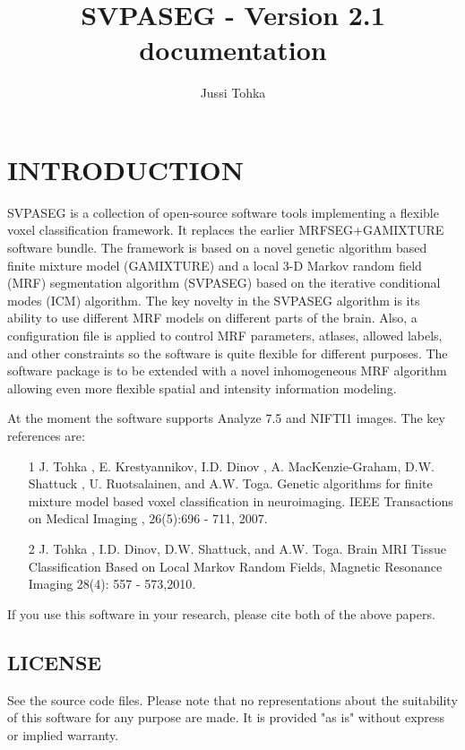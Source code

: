 \documentclass[12pt]{article}
\title{SVPASEG - Version 2.1 documentation}
\author{Jussi Tohka}
\begin{document}
\maketitle 
\tableofcontents

\section{INTRODUCTION}

SVPASEG is a collection of open-source software tools
implementing a flexible voxel classification framework. It replaces the earlier MRFSEG+GAMIXTURE software bundle. The framework is based on a
novel genetic algorithm based finite mixture model (GAMIXTURE) and a local 3-D
Markov random field (MRF) segmentation algorithm (SVPASEG) based on the iterative conditional modes
(ICM) algorithm.  The key novelty in the SVPASEG algorithm is its ability to use different MRF models on different parts of the brain. Also, a configuration file is applied to control MRF parameters, atlases, allowed labels, and other constraints so the software is quite flexible for different purposes.  
The software package is to be extended with a novel
inhomogeneous MRF algorithm allowing even more flexible spatial and
intensity information modeling.  

At the moment the software supports Analyze 7.5 and NIFTI1 images.
The key references are:

\begin{enumerate}
\item[1]  J. Tohka , E. Krestyannikov, I.D. Dinov , A. MacKenzie-Graham,
 D.W. Shattuck , U. Ruotsalainen, and A.W. Toga. 
 Genetic algorithms for finite mixture model based voxel classification
 in neuroimaging.  
 IEEE Transactions on Medical Imaging  , 26(5):696 - 711, 2007. 

\item[2] J. Tohka , I.D. Dinov, D.W. Shattuck, and A.W. Toga. Brain MRI Tissue Classification Based on Local Markov Random Fields,  Magnetic Resonance Imaging  28(4): 557 - 573,2010. 
\end{enumerate}

If you use this software in your research, please cite both of the above papers. 

\subsection{LICENSE}

See the source code files. Please note that no representations
 about the suitability of this software for any purpose are made.  It is
 provided "as is" without express or implied warranty.
\end{document}
